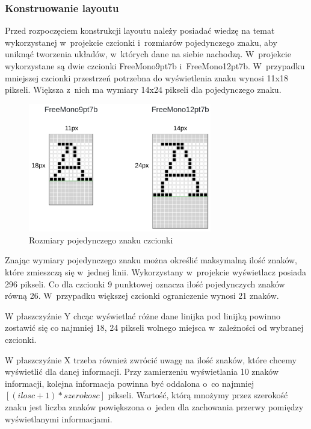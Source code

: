 \documentclass[a4paper,12pt, twoside]{article}
\begin{document}
    	\subsubsection{Konstruowanie layoutu}
    	Przed rozpoczęciem konstrukcji layoutu należy posiadać wiedzę na temat wykorzystanej w~projekcie czcionki i~rozmiarów pojedynczego znaku, aby uniknąć tworzenia układów, w~których dane na siebie nachodzą. W~projekcie wykorzystane są dwie czcionki FreeMono9pt7b i~FreeMono12pt7b. W~przypadku mniejszej czcionki przestrzeń potrzebna do wyświetlenia znaku wynosi 11x18 pikseli. Większa z~nich ma wymiary 14x24 pikseli dla pojedynczego znaku.
    	\begin{figure}[H]
    	        \centering
    			\includegraphics[width=8cm]{images/rozmiarczcionek.png}
    			\caption{Rozmiary pojedynczego znaku czcionki}
                \label{fig:font}
    	\end{figure}
    	
    	Znając wymiary pojedynczego znaku można określić maksymalną ilość znaków, które zmieszczą się w~jednej linii. Wykorzystany w~projekcie wyświetlacz posiada 296 pikseli. Co dla czcionki 9 punktowej oznacza ilość pojedynczych znaków równą 26. W~przypadku większej czcionki ograniczenie wynosi 21 znaków.
    	
    	W płaszczyźnie Y chcąc wyświetlać różne dane linijka pod linijką powinno zostawić się co najmniej 18, 24 pikseli wolnego miejsca w~zależności od wybranej czcionki.
    	
    	W płaszczyźnie X trzeba również zwrócić uwagę na ilość znaków, które chcemy wyświetlić dla danej informacji. Przy zamierzeniu wyświetlania 10 znaków informacji, kolejna informacja powinna być oddalona o~co najmniej \([(ilosc + 1)*szerokosc]\) pikseli. Wartość, którą mnożymy przez szerokość znaku jest liczba znaków powiększona o~jeden dla zachowania przerwy pomiędzy wyświetlanymi informacjami.\newline
    	
\end{document}
